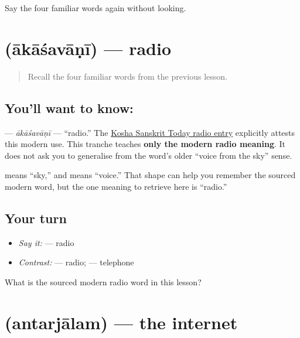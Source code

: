 \begin{tcolorbox}[breakable,colback=teal!4,colframe=teal!35!black,title={Before you move on}]
Say the four familiar words again without looking.
\end{tcolorbox}
\section[\texorpdfstring{\sk{आकाशवाणी} (ākāśavāṇī)}{आकाशवाणी (ākāśavāṇī)}]{ (ākāśavāṇī) — radio}

\label{lesson:SA-C269-akasavani}



\begin{quote}
Recall the four familiar words from the previous lesson.
\end{quote}

\subsection*{You'll want to know: }
\textbf{} — \emph{ākāśavāṇī} — “radio.” The \href{https://kosha.sanskrit.today/word/en/radio}{Kosha Sanskrit Today radio entry} explicitly attests this modern use. This tranche teaches \textbf{only the modern radio meaning}. It does not ask you to generalise from the word's older “voice from the sky” sense.

\begin{cousinweb}
\textbf{} means “sky,” and \textbf{} means “voice.” That shape can help you remember the sourced modern word, but the one meaning to retrieve here is “radio.”
\end{cousinweb}

\subsection*{Your turn}
\begin{itemize}
\raggedright
  \item \emph{Say it:} \textbf{} — radio
  \item \emph{Contrast:} \textbf{} — radio; \textbf{} — telephone
\end{itemize}

\begin{tcolorbox}[breakable,colback=teal!4,colframe=teal!35!black,title={Before you move on}]
What is the sourced modern radio word in this lesson?
\end{tcolorbox}
\section[\texorpdfstring{\sk{अन्तर्जालम्} (antarjālam)}{अन्तर्जालम् (antarjālam)}]{ (antarjālam) — the internet}

